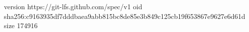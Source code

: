 version https://git-lfs.github.com/spec/v1
oid sha256:c9163935df7dddbaea9abb815bc8de85e3b849c125cb19f653867e9627e6d61d
size 174916
